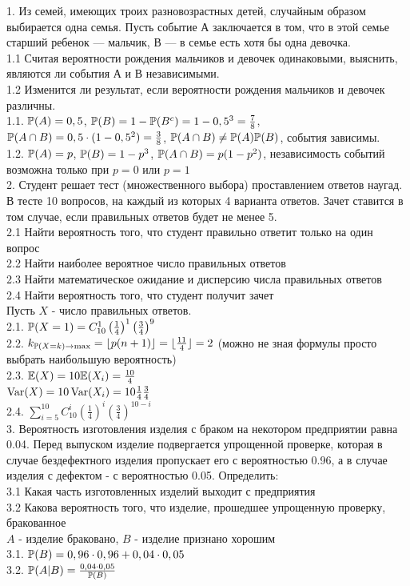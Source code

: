 \documentclass[12pt, a4paper]{article}\usepackage[]{graphicx}\usepackage[]{color}
\begin{document}
	1.  Из семей, имеющих троих разновозрастных детей, случайным
	образом выбирается одна семья. Пусть событие А заключается в том,
	что в этой семье
	старший ребенок — мальчик, В — в семье есть хотя бы одна девочка. \\
	1.1 Считая вероятности рождения мальчиков и девочек одинаковыми,
	выяснить, являются ли события А и В независимыми. \\
	1.2 Изменится ли результат, если вероятности рождения мальчиков и
	девочек различны. \\
	1.1. $\P(A)=0,5$, $\P(B)=1-\P(B^{c})=1-0,5^{3}=\frac{7}{8}$, $\P(A\cap
	B)=0,5\cdot (1-0,5^{2})=\frac{3}{8}$, $\P(A\cap B)\neq \P(A)\P(B)$,
	события зависимы. \\
	1.2. $\P(A)=p$, $\P(B)=1-p^{3}$, $\P(A\cap B)=p(1-p^{2})$,
	независимость событий возможна только при $p=0$ или $p=1$ \\

	2.  Студент решает тест (множественного выбора) проставлением
	ответов наугад. В тесте 10 вопросов, на каждый из которых 4
	варианта ответов. Зачет ставится в том случае, если правильных
	ответов будет не менее 5. \\
	2.1 Найти вероятность того, что студент правильно ответит только
	на один вопрос \\
	2.2 Найти наиболее вероятное число правильных ответов \\
	2.3 Найти математическое ожидание и дисперсию числа правильных
	ответов \\
	2.4 Найти вероятность того, что студент получит зачет \\
	Пусть $X$ - число правильных ответов. \\
	2.1. $\P(X=1)=C_{10}^{1}\left(\frac{1}{4}\right)^{1}\left(\frac{3}{4}\right)^{9}$ \\
	2.2. $k_{\P(X=k)\rightarrow \max}=\lfloor p(n+1)\rfloor=\lfloor
	\frac{11}{4}\rfloor=2$ (можно не зная формулы просто выбрать
	наибольшую вероятность) \\
	2.3. $\E(X)=10\E(X_{i})=\frac{10}{4}$ \\
	$\Var(X)=10\Var(X_{i})=10\frac{1}{4}\frac{3}{4}$ \\
	2.4.
	$\sum_{i=5}^{10}C_{10}^{i}\left(\frac{1}{4}\right)^{i}\left(\frac{3}{4}\right)^{10-i}$
	\\

	3.  Вероятность изготовления изделия с браком на некотором
	предприятии равна 0.04. Перед выпуском изделие подвергается
	упрощенной проверке, которая в случае бездефектного изделия
	пропускает его с вероятностью 0.96, а в случае изделия с дефектом
	- с вероятностью 0.05. Определить: \\
	3.1 Какая часть изготовленных изделий выходит с предприятия \\
	3.2 Какова вероятность того, что изделие, прошедшее упрощенную
	проверку, бракованное \\
	$A$ - изделие браковано, $B$ - изделие признано хорошим \\
	3.1. $\P(B)=0,96\cdot 0,96+0,04\cdot 0,05$ \\
	3.2. $\P(A|B)=\frac{0,04\cdot 0,05}{\P(B)}$ \\
\end{document}
